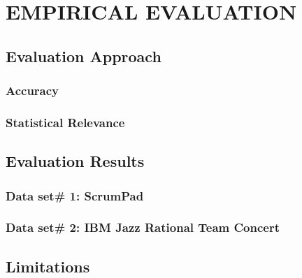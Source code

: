 \fancyhead[RO,LE]{\thepage}
\fancyfoot{} 
\chapter{EMPIRICAL EVALUATION}
\section{Evaluation Approach}
	\subsection{Accuracy}
	\subsection{Statistical Relevance}
\section{Evaluation Results}
	\subsection{Data set\# 1: ScrumPad}	
	\subsection{Data set\# 2: IBM Jazz Rational Team Concert}
\section{Limitations}
	
